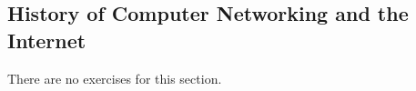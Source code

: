 \subsection{History of Computer Networking and the Internet}
There are no exercises for this section.